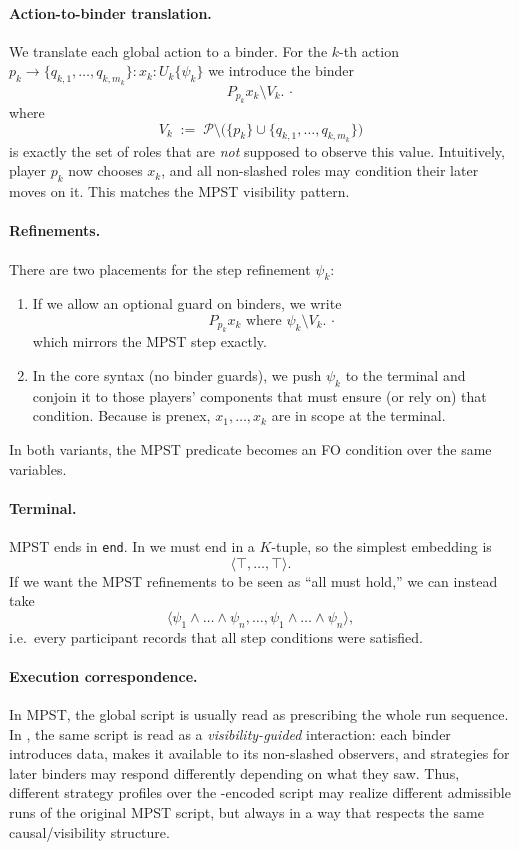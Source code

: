 \paragraph{Action-to-binder translation.}
We translate each global action to a \KFOL{} binder. For the $k$-th action
\(
  p_k \to \{q_{k,1},\dots,q_{k,m_k}\} : x_k : U_k \{ \psi_k \}
\)
we introduce the binder
\[
  P_{p_k} x_k \setminus V_k.\,\cdot
\]
where
\[
  V_k \;:=\; \mathcal{P} \setminus \bigl(\{p_k\} \cup \{q_{k,1},\dots,q_{k,m_k}\}\bigr)
\]
is exactly the set of roles that are \emph{not} supposed to observe this value.
Intuitively, player $p_k$ now chooses $x_k$, and all non-slashed roles may
condition their later moves on it. This matches the MPST visibility pattern.

\paragraph{Refinements.}
There are two placements for the step refinement $\psi_k$:

\begin{enumerate}[label=(\roman*),nosep]
  \item If we allow an optional guard on binders, we write
        \[
          P_{p_k} x_k \text{ where } \psi_k \setminus V_k.\,\cdot
        \]
        which mirrors the MPST step exactly.
  \item In the core \KFOL{} syntax (no binder guards), we push $\psi_k$ to the
        terminal and conjoin it to those players’ components that must ensure
        (or rely on) that condition. Because \KFOL{} is prenex, $x_1,\dots,x_k$
        are in scope at the terminal.
\end{enumerate}

In both variants, the MPST predicate becomes an FO condition over the same
variables.

\paragraph{Terminal.}
MPST ends in \texttt{end}. In \KFOL{} we must end in a $K$-tuple, so the
simplest embedding is
\[
  \langle \top,\dots,\top \rangle.
\]
If we want the MPST refinements to be seen as “all must hold,” we can instead
take
\[
  \langle \psi_1 \land \dots \land \psi_n,\dots,\psi_1 \land \dots \land \psi_n \rangle,
\]
i.e.\ every participant records that all step conditions were satisfied.

\paragraph{Execution correspondence.}
In MPST, the global script is usually read as prescribing the whole run
sequence. In \KFOL{}, the same script is read as a \emph{visibility-guided}
interaction: each binder introduces data, makes it available to its
non-slashed observers, and strategies for later binders may respond differently
depending on what they saw. Thus, different strategy profiles over the
\KFOL{}-encoded script may realize different admissible runs of the original
MPST script, but always in a way that respects the same causal/visibility
structure.

